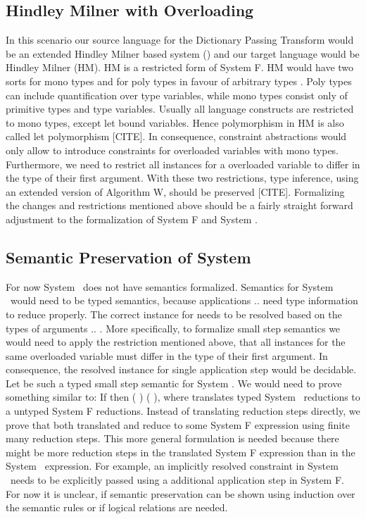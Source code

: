 \subsection{Hindley Milner with Overloading}
In this scenario our source language for the Dictionary Passing Transform would be an extended Hindley Milner based system (\HMo) and our target language would be Hindley Milner (HM). 
HM is a restricted form of System F. HM would have two sorts  for mono types and  for poly types in favour of arbitrary types . Poly types can include quantification over type variables, while mono types consist only of primitive types and type variables. 
Usually all language constructs are restricted to mono types, except let bound variables. 
Hence polymorphism in HM is also called let polymorphism [CITE].  
In consequence, constraint abstractions would only allow to introduce constraints for overloaded variables with mono types. 
Furthermore, we need to restrict all instances for a overloaded variable  to differ in the type of their first argument.
With these two restrictions, type inference, using an extended version of Algorithm W, should be preserved [CITE]. Formalizing the changes and restrictions mentioned above should be a fairly straight forward adjustment to the formalization of System F and System \Fo.

\subsection{Semantic Preservation of System \Fo}
For now System \Fo\ does not have semantics formalized.
Semantics for System \Fo\ would need to be typed semantics, because applications     $..$   need type information to reduce properly.
The correct instance for  needs to be resolved based on the types of arguments  $..$ . 
More specifically, to formalize small step semantics we would need to apply the restriction mentioned above, that all instances for the same overloaded variable  must differ in the type of their first argument. 
In consequence, the resolved instance for single application step     would be decidable.
Let    be such a typed small step semantic for System \Fo. We would need to prove something similar to: If    then  \Constr{[}  \Constr{]} (   )  (   ), where  translates typed System \Fo\ reductions to a untyped System F reductions.
Instead of translating reduction steps directly, we prove that both translated  and  reduce to some System F expression  using finite many reduction steps.
This more general formulation is needed because there might be more reduction steps in the translated System F expression than in the System \Fo\ expression. 
For example, an implicitly resolved constraint in System \Fo\ needs to be explicitly passed using a additional application step in System F. For now it is unclear, if semantic preservation can be shown using induction over the semantic rules or if logical relations are needed.

